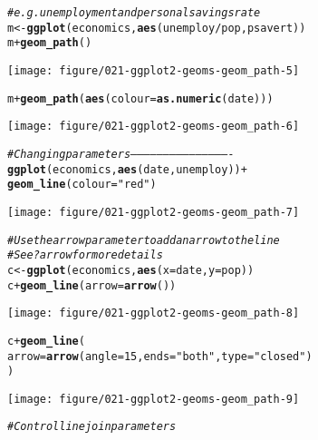 \documentclass[a4paper,titlepage]{tufte-handout}\usepackage[]{graphicx}\usepackage[]{color}
\makeatletter
\def\maxwidth{ %
  \ifdim\Gin@nat@width>\linewidth
    \linewidth
  \else
    \Gin@nat@width
  \fi
}
\newcommand{\hlnum}[1]{\textcolor[rgb]{0.686,0.059,0.569}{#1}}%
\newcommand{\hlstr}[1]{\textcolor[rgb]{0.192,0.494,0.8}{#1}}%
\newcommand{\hlcom}[1]{\textcolor[rgb]{0.678,0.584,0.686}{\textit{#1}}}%
\newcommand{\hlopt}[1]{\textcolor[rgb]{0,0,0}{#1}}%
\newcommand{\hlstd}[1]{\textcolor[rgb]{0.345,0.345,0.345}{#1}}%
\newcommand{\hlkwb}[1]{\textcolor[rgb]{0.69,0.353,0.396}{#1}}%
\newcommand{\hlkwc}[1]{\textcolor[rgb]{0.333,0.667,0.333}{#1}}%
\newcommand{\hlkwd}[1]{\textcolor[rgb]{0.737,0.353,0.396}{\textbf{#1}}}%
\newenvironment{kframe}{%
 \def\at@end@of@kframe{}%
 \ifinner\ifhmode%
  \def\at@end@of@kframe{\end{minipage}}%
  \begin{minipage}{\columnwidth}%
 \fi\fi%
 \def\FrameCommand##1{\hskip\@totalleftmargin \hskip-\fboxsep
 \colorbox{shadecolor}{##1}\hskip-\fboxsep
     \hskip-\linewidth \hskip-\@totalleftmargin \hskip\columnwidth}%
 \MakeFramed {\advance\hsize-\width
   \@totalleftmargin\z@ \linewidth\hsize
   \@setminipage}}%
 {\par\unskip\endMakeFramed%
 \at@end@of@kframe}
\newenvironment{knitrout}{}{} %
\makeatother
\begin{document}
\begin{knitrout}
\begin{kframe}
\begin{alltt}
\hlcom{# e.g. unemployment and personal savings rate}
\hlstd{m} \hlkwb{<-} \hlkwd{ggplot}\hlstd{(economics,} \hlkwd{aes}\hlstd{(unemploy}\hlopt{/}\hlstd{pop, psavert))}
\hlstd{m} \hlopt{+} \hlkwd{geom_path}\hlstd{()}
\end{alltt}
\end{kframe}
\texttt{[image: figure/021-ggplot2-geoms-geom\_path-5]} 
\begin{kframe}\begin{alltt}
\hlstd{m} \hlopt{+} \hlkwd{geom_path}\hlstd{(}\hlkwd{aes}\hlstd{(}\hlkwc{colour} \hlstd{=} \hlkwd{as.numeric}\hlstd{(date)))}
\end{alltt}
\end{kframe}
\texttt{[image: figure/021-ggplot2-geoms-geom\_path-6]} 
\begin{kframe}\begin{alltt}
\hlcom{# Changing parameters ----------------------------------------------}
\hlkwd{ggplot}\hlstd{(economics,} \hlkwd{aes}\hlstd{(date, unemploy))} \hlopt{+}
  \hlkwd{geom_line}\hlstd{(}\hlkwc{colour} \hlstd{=} \hlstr{"red"}\hlstd{)}
\end{alltt}
\end{kframe}
\texttt{[image: figure/021-ggplot2-geoms-geom\_path-7]} 
\begin{kframe}\begin{alltt}
\hlcom{# Use the arrow parameter to add an arrow to the line}
\hlcom{# See ?arrow for more details}
\hlstd{c} \hlkwb{<-} \hlkwd{ggplot}\hlstd{(economics,} \hlkwd{aes}\hlstd{(}\hlkwc{x} \hlstd{= date,} \hlkwc{y} \hlstd{= pop))}
\hlstd{c} \hlopt{+} \hlkwd{geom_line}\hlstd{(}\hlkwc{arrow} \hlstd{=} \hlkwd{arrow}\hlstd{())}
\end{alltt}
\end{kframe}
\texttt{[image: figure/021-ggplot2-geoms-geom\_path-8]} 
\begin{kframe}\begin{alltt}
\hlstd{c} \hlopt{+} \hlkwd{geom_line}\hlstd{(}
  \hlkwc{arrow} \hlstd{=} \hlkwd{arrow}\hlstd{(}\hlkwc{angle} \hlstd{=} \hlnum{15}\hlstd{,} \hlkwc{ends} \hlstd{=} \hlstr{"both"}\hlstd{,} \hlkwc{type} \hlstd{=} \hlstr{"closed"}\hlstd{)}
\hlstd{)}
\end{alltt}
\end{kframe}
\texttt{[image: figure/021-ggplot2-geoms-geom\_path-9]} 
\begin{kframe}\begin{alltt}
\hlcom{# Control line join parameters}

\end{alltt}
\end{kframe}
\end{knitrout}
\end{document}
